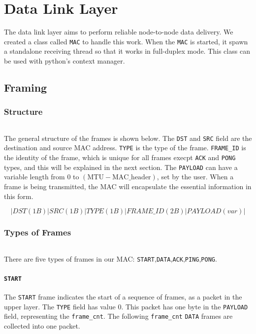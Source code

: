 \chapter{Data Link Layer}\label{ch:ch3label}

The data link layer aims to perform reliable node-to-node data delivery. We created a class called {\tt MAC} to handle this work. When the {\tt MAC} is started, it spawn a standalone receiving thread so that it works in full-duplex mode. This class can be used with python's context manager.

\section{Framing}

    \subsection{Structure}
        \subparagraph{}
        The general structure of the frames is shown below. The {\tt DST} and {\tt SRC} field are the destination and source MAC address. {\tt TYPE} is the type of the frame. {\tt FRAME\_ID} is the identity of the frame, which is unique for all frames execpt {\tt ACK} and {\tt PONG} types, and this will be explained in the next section. The {\tt PAYLOAD} can have a variable length from 0 to $(\text{MTU} - \text{MAC\_header})$, set by the user. When a frame is being transmitted, the MAC will encapsulate the essential information in this form.

        $$|DST (1B)|SRC(1B)|TYPE(1B)|FRAME\_ID(2B)|PAYLOAD(var)|$$

    \subsection{Types of Frames\textbf{}}
        \subparagraph{}
        There are five types of frames in our MAC: \texttt{START},\texttt{DATA},\texttt{ACK},\texttt{PING},\texttt{PONG}.
        
        \subsubsection{\texttt{START}}
            The \texttt{START} frame indicates the start of a sequence of frames, as a packet in the upper layer. The \texttt{TYPE} field has value 0. This packet has one byte in the \texttt{PAYLOAD} field, representing the \texttt{frame\_cnt}. The following \texttt{frame\_cnt} \texttt{DATA} frames are collected into one packet.
            
